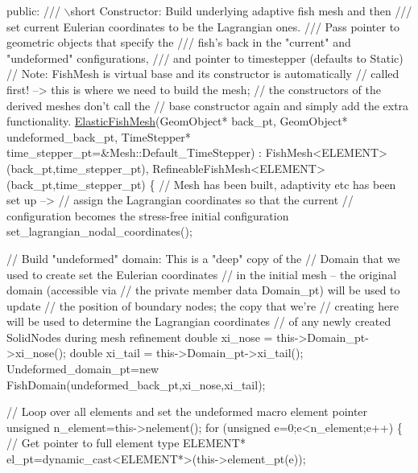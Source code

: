\begin{DoxyCodeInclude}
\textcolor{keyword}{public}:
\textcolor{comment}{}
\textcolor{comment}{ /// \(\backslash\)short Constructor: Build underlying adaptive fish mesh and then }
\textcolor{comment}{ /// set current Eulerian coordinates to be the Lagrangian ones.}
\textcolor{comment}{ /// Pass pointer to geometric objects that specify the }
\textcolor{comment}{ /// fish's back in the "current" and "undeformed" configurations,}
\textcolor{comment}{ /// and pointer to timestepper (defaults to Static)}
\textcolor{comment}{} \textcolor{comment}{// Note: FishMesh is virtual base and its constructor is automatically}
 \textcolor{comment}{// called first! --> this is where we need to build the mesh;}
 \textcolor{comment}{// the constructors of the derived meshes don't call the}
 \textcolor{comment}{// base constructor again and simply add the extra functionality.}
 \hyperlink{classElasticFishMesh}{ElasticFishMesh}(GeomObject* back\_pt, GeomObject* undeformed\_back\_pt, 
                 TimeStepper* time\_stepper\_pt=&Mesh::Default\_TimeStepper) : 
  FishMesh<ELEMENT>(back\_pt,time\_stepper\_pt), 
  RefineableFishMesh<ELEMENT>(back\_pt,time\_stepper\_pt)
  \{
   \textcolor{comment}{// Mesh has been built, adaptivity etc has been set up --> }
   \textcolor{comment}{// assign the Lagrangian coordinates so that the current}
   \textcolor{comment}{// configuration becomes the stress-free initial configuration }
   set\_lagrangian\_nodal\_coordinates();

   \textcolor{comment}{// Build "undeformed" domain: This is a "deep" copy of the}
   \textcolor{comment}{// Domain that we used to create set the Eulerian coordinates}
   \textcolor{comment}{// in the initial mesh -- the original domain (accessible via }
   \textcolor{comment}{// the private member data Domain\_pt) will be used to update}
   \textcolor{comment}{// the position of boundary nodes; the copy that we're}
   \textcolor{comment}{// creating here will be used to determine the Lagrangian coordinates}
   \textcolor{comment}{// of any newly created SolidNodes during mesh refinement}
   \textcolor{keywordtype}{double} xi\_nose = this->Domain\_pt->xi\_nose(); 
   \textcolor{keywordtype}{double} xi\_tail = this->Domain\_pt->xi\_tail();
   Undeformed\_domain\_pt=\textcolor{keyword}{new} FishDomain(undeformed\_back\_pt,xi\_nose,xi\_tail);

   \textcolor{comment}{// Loop over all elements and set the undeformed macro element pointer}
   \textcolor{keywordtype}{unsigned} n\_element=this->nelement();
   \textcolor{keywordflow}{for} (\textcolor{keywordtype}{unsigned} e=0;e<n\_element;e++)
    \{
     \textcolor{comment}{// Get pointer to full element type }
     ELEMENT* el\_pt=\textcolor{keyword}{dynamic\_cast<}ELEMENT*\textcolor{keyword}{>}(this->element\_pt(e));
     

\end{DoxyCodeInclude}
